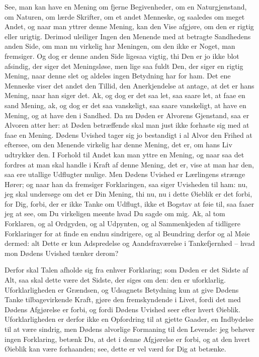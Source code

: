 \documentclass[12pt,a4paper]{article}
\begin{document}
See, man kan have en Mening om fjerne Begivenheder, om en Naturgjenstand, om Naturen, om lærde Skrifter, om et andet Menneske, og saaledes om meget Andet, og naar man yttrer denne Mening, kan den Vise afgjøre, om den er rigtig eller urigtig. Derimod uleiliger Ingen den Menende med at betragte Sandhedens anden Side, om man nu virkelig har Meningen, om den ikke er Noget, man fremsiger. Og dog er denne anden Side ligesaa vigtig, thi Den er jo ikke blot afsindig, der siger det Meningsløse, men lige saa fuldt Den, der siger en rigtig Mening, naar denne slet og aldeles ingen Betydning har for ham. Det ene Menneske viser det andet den Tillid, den Anerkjendelse at antage, at det er hans Mening, naar han siger det. Ak, og dog er det saa let, saa saare let, at faae en sand Mening, ak, og dog er det saa vanskeligt, saa saare vanskeligt, at have en Mening, og at have den i Sandhed. Da nu Døden er Alvorens Gjenstand, saa er Alvoren atter her: at Døden betræffende skal man just ikke forhaste sig med at faae en Mening. Dødens Uvished tager sig jo bestandigt i al Alvor den Frihed at eftersee, om den Menende virkelig har denne Mening, det er, om hans Liv udtrykker den. I Forhold til Andet kan man yttre en Mening, og naar saa det fordres at man skal handle i Kraft af denne Mening, det er, vise at man har den, saa ere utallige Udflugter mulige. Men Dødens Uvished er Lærlingens strænge Hører; og naar han da fremsiger Forklaringen, saa siger Uvisheden til ham: nu, jeg skal undersøge om det er Din Mening, thi nu, nu i dette Øieblik er det forbi, for Dig, forbi, der er ikke Tanke om Udflugt, ikke et Bogstav at føie til, saa faaer jeg at see, om Du virkeligen meente hvad Du sagde om mig. Ak, al tom Forklaren, og al Ordgyden, og al Udpynten, og al Sammenkjeden af tidligere Forklaringer for at finde en endnu sindrigere, og al Beundring derfor og al Møie dermed: alt Dette er kun Adspredelse og Aandsfraværelse i Tankefjernhed – hvad mon Dødens Uvished tænker derom?

Derfor skal Talen afholde sig fra enhver Forklaring; som Døden er det Sidste af Alt, saa skal dette være det Sidste, der siges om den: den er uforklarlig. Uforklarligheden er Grændsen, og Udsagnets Betydning kun at give Dødens Tanke tilbagevirkende Kraft, gjøre den fremskyndende i Livet, fordi det med Dødens Afgjørelse er forbi, og fordi Dødens Uvished seer efter hvert Øieblik. Uforklarligheden er derfor ikke en Opfordring til at gjette Gaader, en Indbydelse til at være sindrig, men Dødens alvorlige Formaning til den Levende: jeg behøver ingen Forklaring, betænk Du, at det i denne Afgjørelse er forbi, og at den hvert Øieblik kan være forhaanden; see, dette er vel værd for Dig at betænke.
\end{document}
